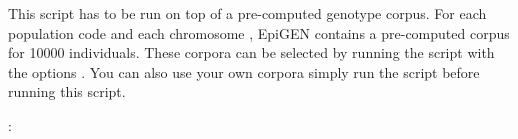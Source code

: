 \documentclass[a4paper,10pt,english]{sphinxhowto}
\begin{document}
This script has to be run on top of a pre-computed genotype corpus. For each population code 
and each chromosome , EpiGEN contains a pre-computed corpus for 10000 individuals. These corpora
can be selected by running the script with the options .
You can also use your own corpora \textendash{} simply run the script  before running this script.

:

\begin{sphinxVerbatim}[commandchars=\\\{\}]
  \PYG{p}{[} \PYG{p}{]} \PYG{p}{[} \PYG{p}{]}
\end{sphinxVerbatim}
\end{document}
